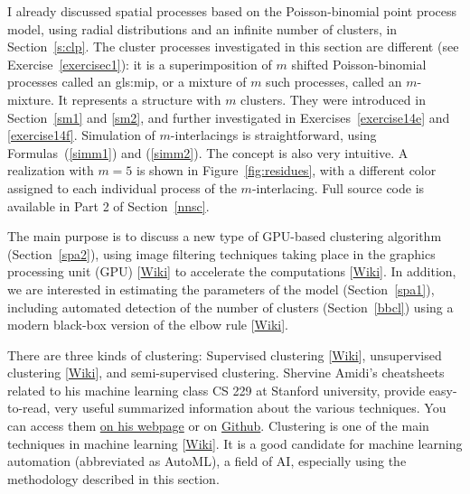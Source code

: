 \documentclass[10pt]{article}
\begin{document}
I already discussed \textcolor{index}{spatial processes} based on the Poisson-binomial point process model, using \textcolor{index}{radial distributions} and an infinite number of clusters, in
Section~\ref{s:clp}. The \textcolor{index}{cluster processes} investigated in this section are different (see Exercise~\ref{exercisec1}):    
it is a \textcolor{index}{superimposition} of $m$ 
\textcolor{index}{shifted} Poisson-binomial processes 
called an \gls{gls:mip}, or a \textcolor{index}{mixture} of $m$ such processes, 
called an \textcolor{index}{$m$-mixture}. It represents a structure with $m$ clusters. They were introduced in Section~\ref{sm1} and \ref{sm2}, and further investigated in Exercises~\ref{exercise14e} and \ref{exercise14f}. Simulation of \textcolor{index}{$m$-interlacings} is straightforward, using Formulas~(\ref{simm1}) and (\ref{simm2}). The concept is also very intuitive. A realization with $m=5$ is shown in Figure~\ref{fig:residues}, with a different color assigned to each individual process of the $m$-interlacing. Full source code is available in Part 2 of Section~\ref{nnsc}.




The main purpose is to discuss a new type of \textcolor{index}{GPU-based clustering algorithm} (Section~\ref{spa2}), using image filtering techniques taking place in the graphics processing unit (GPU)
[\href{https://en.wikipedia.org/wiki/Graphics_processing_unit}{Wiki}] to accelerate the computations [\href{https://en.wikipedia.org/wiki/AI_accelerator}{Wiki}].  In addition, we are interested in estimating the parameters of the model (Section~\ref{spa1}), including automated detection of the number of clusters (Section~\ref{bbcl})
using a modern black-box version of the \textcolor{index}{elbow rule} [\href{https://en.wikipedia.org/wiki/Elbow_method_(clustering)}{Wiki}].

There are three kinds of clustering: \textcolor{index}{Supervised clustering} 
[\href{https://en.wikipedia.org/wiki/Supervised_learning}{Wiki}],
 \textcolor{index}{unsupervised clustering} [\href{https://en.wikipedia.org/wiki/Cluster_analysis}{Wiki}], and semi-supervised clustering. 
Shervine Amidi's cheatsheets related to his machine learning class CS 229 at Stanford university, provide easy-to-read, very useful summarized information about the various techniques. You can access them \href{https://stanford.edu/~shervine/teaching/cs-229/}{on his webpage} or on \href{https://github.com/afshinea/stanford-cs-229-machine-learning/blob/master/en/cheatsheet-unsupervised-learning.pdf}{Github}. 
Clustering is one of the main techniques in machine learning
 [\href{https://en.wikipedia.org/wiki/Machine_learning}{Wiki}]. It is a good candidate for machine learning automation (abbreviated as AutoML), a field of AI, especially using the methodology described in this section.
\end{document}
